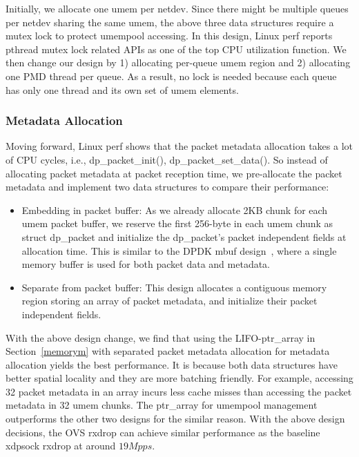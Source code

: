 \documentclass[10pt,numbers,reprint]{sigplanconf}
\begin{document}
Initially, we allocate one umem per netdev. Since there might be multiple
queues per netdev sharing the same umem, the above three data structures
require a mutex lock to protect umempool accessing. In this design, Linux
perf reports pthread mutex lock related APIs as one of the top CPU
utilization function.
We then change our design by 1) allocating per-queue umem region and 2)
allocating one PMD thread per queue. As a result, no lock is needed because
each queue has only one thread and its own set of umem elements.

\subsubsection{Metadata Allocation}
Moving forward, Linux perf shows that the packet metadata allocation
takes a lot of CPU cycles, i.e.,  dp\_packet\_init(), dp\_packet\_set\_data().
So instead of allocating packet metadata at packet reception time, we pre-allocate
the packet metadata and implement two data structures to compare their performance:
\begin{itemize}
\item Embedding in packet buffer: As we already allocate 2KB chunk for each
umem packet buffer, we reserve the first 256-byte in each umem chunk as struct dp\_packet
and initialize the dp\_packet's packet independent fields  at allocation time.
This is similar to the DPDK mbuf design~\cite{dpdkmbuf}, where a single memory buffer
is used for both packet data and metadata.
\item Separate from packet buffer: This design allocates a contiguous memory
region storing an array of packet metadata, and initialize their packet
independent fields.
\end{itemize}


With the above design change, we find that using the LIFO-ptr\_array in
Section~\ref{memorym} with separated packet metadata allocation for
metadata allocation yields the
best performance. It is because both data structures have better spatial
locality and they are more batching friendly.
For example, accessing 32 packet metadata in an array incurs less cache
misses than accessing the packet metadata in 32 umem chunks.
The ptr\_array for umempool management outperforms the other two designs
for the similar reason. With the above design decisions, the OVS rxdrop
can achieve similar performance as the baseline xdpsock rxdrop at around
$19Mpps$.
\end{document}
